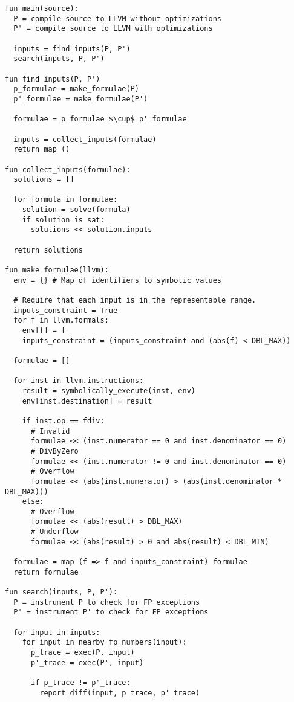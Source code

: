 \documentclass{article}
\begin{document}
\begin{lstlisting}[mathescape=true]
fun main(source):
  P = compile source to LLVM without optimizations
  P' = compile source to LLVM with optimizations

  inputs = find_inputs(P, P')
  search(inputs, P, P')

fun find_inputs(P, P')
  p_formulae = make_formulae(P)
  p'_formulae = make_formulae(P')

  formulae = p_formulae $\cup$ p'_formulae

  inputs = collect_inputs(formulae)
  return map ()

fun collect_inputs(formulae):
  solutions = []

  for formula in formulae:
    solution = solve(formula)
    if solution is sat:
      solutions << solution.inputs

  return solutions

fun make_formulae(llvm):
  env = {} # Map of identifiers to symbolic values

  # Require that each input is in the representable range.
  inputs_constraint = True
  for f in llvm.formals:
    env[f] = f
    inputs_constraint = (inputs_constraint and (abs(f) < DBL_MAX))

  formulae = []

  for inst in llvm.instructions:
    result = symbolically_execute(inst, env)
    env[inst.destination] = result

    if inst.op == fdiv:
      # Invalid
      formulae << (inst.numerator == 0 and inst.denominator == 0)
      # DivByZero
      formulae << (inst.numerator != 0 and inst.denominator == 0)
      # Overflow
      formulae << (abs(inst.numerator) > (abs(inst.denominator * DBL_MAX)))
    else:
      # Overflow
      formulae << (abs(result) > DBL_MAX)
      # Underflow
      formulae << (abs(result) > 0 and abs(result) < DBL_MIN)

  formulae = map (f => f and inputs_constraint) formulae
  return formulae

fun search(inputs, P, P'):
  P = instrument P to check for FP exceptions
  P' = instrument P' to check for FP exceptions

  for input in inputs:
    for input in nearby_fp_numbers(input):
      p_trace = exec(P, input)
      p'_trace = exec(P', input)

      if p_trace != p'_trace:
        report_diff(input, p_trace, p'_trace)
\end{lstlisting}

\printbibliography
\end{document}
